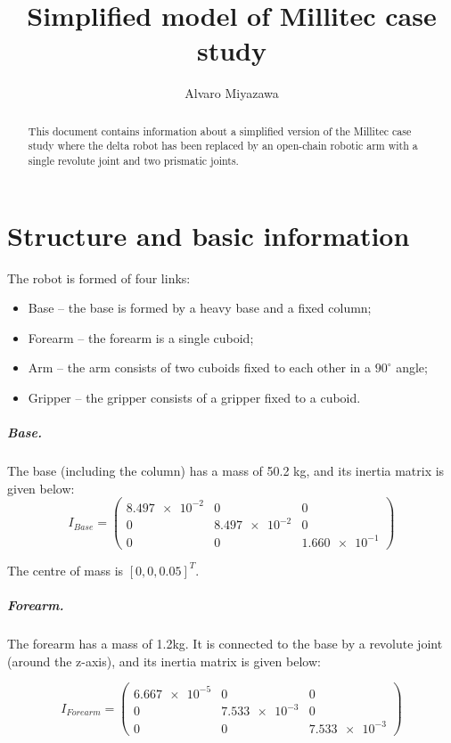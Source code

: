 \documentclass[]{scrreprt}
\title{Simplified model of Millitec case study}
\author{Alvaro Miyazawa}
\begin{document}
\maketitle

\begin{abstract}
	This document contains information about a simplified version of the Millitec case study
	where the delta robot has been replaced by an open-chain robotic arm with a single
	revolute joint and two prismatic joints.
\end{abstract}

\chapter{Structure and basic information}

The robot is formed of four links:

\begin{itemize}
	\item Base -- the base is formed by a heavy base and a fixed column;
	\item Forearm -- the forearm is a single cuboid;
	\item Arm -- the arm consists of two cuboids fixed to each other in a $90^\circ$ angle;
	\item Gripper -- the gripper consists of a gripper fixed to a cuboid.
\end{itemize}

\paragraph{Base.} The base (including the column) has a mass of 50.2 kg, and its inertia matrix is given below:
\[
I_{Base} = 
\left(
\begin{array}{ccc}
\num{+8.497e-2} & \num{0} & \num{0}\\
\num{0} & \num{+8.497e-2} & \num{0}\\
\num{0} & \num{0} & \num{+1.660e-1}
\end{array}
\right)
\]

The centre of mass is $[0,0,0.05]^T$.


\paragraph{Forearm.} The forearm has a mass of 1.2kg. It is connected to the base by a revolute joint (around the z-axis), and its inertia matrix is given below:

\[
I_{Forearm} = 
\left(
\begin{array}{ccc}
\num{+6.667e-5} & \num{0} & \num{0}\\
\num{0} & \num{+7.533e-3} & \num{0}\\
\num{0} & \num{0} & \num{+7.533e-3}
\end{array}
\right)
\]
\end{document}

